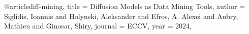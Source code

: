 @article{diff-mining,
  title = {Diffusion Models as Data Mining Tools},
  author = {Siglidis, Ioannis and Holynski, Aleksander and Efros, A. Alexei and Aubry, Mathieu and Ginosar, Shiry},
  journal = {ECCV},
  year = {2024},
}
